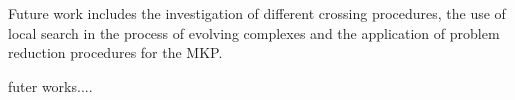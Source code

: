 Future work includes the investigation of different crossing procedures,
the use of local search in the process of evolving complexes and the
application of problem reduction procedures for the MKP.

futer works....
